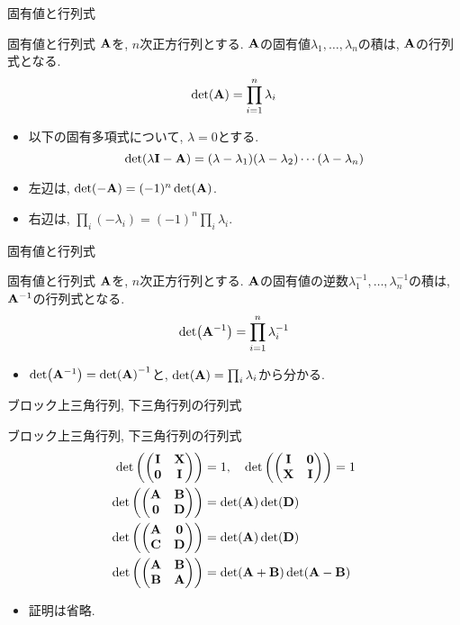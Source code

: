 \documentclass[dvipdfmx,notheorems,t]{beamer}
\begin{document}
\begin{frame}{固有値と行列式}
\begin{block}{固有値と行列式}
  $\vb{A}$を, $n$次正方行列とする.
  $\vb{A}$の固有値$\lambda_1, \ldots, \lambda_n$の積は, $\vb{A}$の行列式となる.
  $$\det(\vb{A}) = \prod_{i = 1}^n \lambda_i$$
\end{block}

\begin{itemize}
  \item 以下の固有多項式について, $\lambda = 0$とする.
  $$\det(\lambda \vb{I} - \vb{A}) = (\lambda - \lambda_1) (\lambda - \lambda_2) \cdots (\lambda - \lambda_n)$$
  \item 左辺は, $\det(-\vb{A}) = (-1)^n \det(\vb{A})$.
  \item 右辺は, $\prod_i (-\lambda_i) = (-1)^n \prod_i \lambda_i$.
\end{itemize}
\end{frame}

\begin{frame}{固有値と行列式}
\begin{block}{固有値と行列式}
  $\vb{A}$を, $n$次正方行列とする.
  $\vb{A}$の固有値の逆数$\lambda_1^{-1}, \ldots, \lambda_n^{-1}$の積は, $\vb{A}^{-1}$の行列式となる.
  $$\det(\vb{A}^{-1}) = \prod_{i = 1}^n \lambda_i^{-1}$$
\end{block}

\begin{itemize}
  \item $\det(\vb{A}^{-1}) = \det(\vb{A})^{-1}$と, $\det(\vb{A}) = \prod_i \lambda_i$から分かる.
\end{itemize}
\end{frame}

\begin{frame}{ブロック上三角行列, 下三角行列の行列式}
\begin{block}{ブロック上三角行列, 下三角行列の行列式}
  \begin{align*}
    \det\left( \mqty(\vb{I} & \vb{X} \\ \vb{0} & \vb{I}) \right) &= 1, \quad
    \det\left( \mqty(\vb{I} & \vb{0} \\ \vb{X} & \vb{I}) \right) = 1 \\
    \det\left( \mqty(\vb{A} & \vb{B} \\ \vb{0} & \vb{D}) \right)
      &= \det(\vb{A}) \det(\vb{D}) \\
    \det\left( \mqty(\vb{A} & \vb{0} \\ \vb{C} & \vb{D}) \right)
      &= \det(\vb{A}) \det(\vb{D}) \\
    \det\left( \mqty(\vb{A} & \vb{B} \\ \vb{B} & \vb{A}) \right)
      &= \det(\vb{A} + \vb{B}) \det(\vb{A} - \vb{B})
  \end{align*}
\end{block}

\begin{itemize}
  \item 証明は省略.
\end{itemize}
\end{frame}
\end{document}
